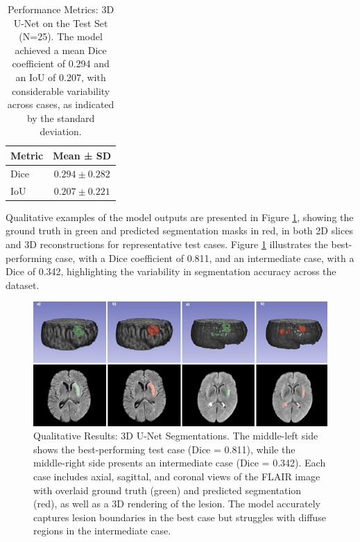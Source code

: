 \documentclass[12pt]{article}
\begin{document}
\begin{table}[tp]
\centering
\begin{tabular}{lc}
\toprule
\textbf{Metric} & \textbf{Mean ± SD} \\
\midrule
Dice & $0.294 \pm 0.282$ \\
IoU & $0.207 \pm 0.221$ \\
\bottomrule
\end{tabular}
\caption{Performance Metrics: 3D U-Net on the Test Set (N=25). The model achieved a mean Dice coefficient of 0.294 and an IoU of 0.207, with considerable variability across cases, as indicated by the standard deviation.}
\label{tab:unet_metrics}
\end{table}

Qualitative examples of the model outputs are presented in Figure \ref{fig:unet_qualitative}, showing the ground truth in green and predicted segmentation masks in red, in both 2D slices and 3D reconstructions for representative test cases. Figure \ref{fig:unet_qualitative} illustrates the best-performing case, with a Dice coefficient of 0.811, and an intermediate case, with a Dice of 0.342, highlighting the variability in segmentation accuracy across the dataset.

\begin{figure}[tp]
    \centering
    \includegraphics[width=\textwidth]{figures/Figure 2.jpg}
    \caption{Qualitative Results: 3D U-Net Segmentations. The middle-left side shows the best-performing test case (Dice = 0.811), while the middle-right side presents an intermediate case (Dice = 0.342). Each case includes axial, sagittal, and coronal views of the FLAIR image with overlaid ground truth (green) and predicted segmentation (red), as well as a 3D rendering of the lesion. The model accurately captures lesion boundaries in the best case but struggles with diffuse regions in the intermediate case.}
    \label{fig:unet_qualitative}
\end{figure}
\end{document}
